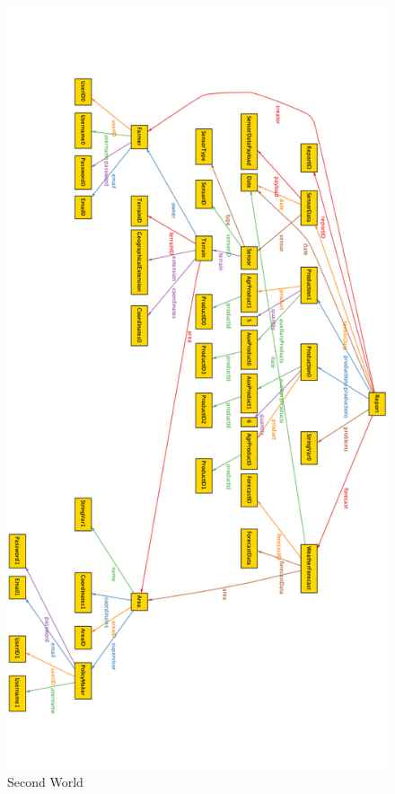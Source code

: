 \documentclass[10pt]{article}
\begin{document}
\begin{figure}[]
    \centering
    \includegraphics[scale=0.30]{images/worlds/world2.png}
    \caption{Second World}
    \label{fig:w2}
\end{figure}
\end{document}

